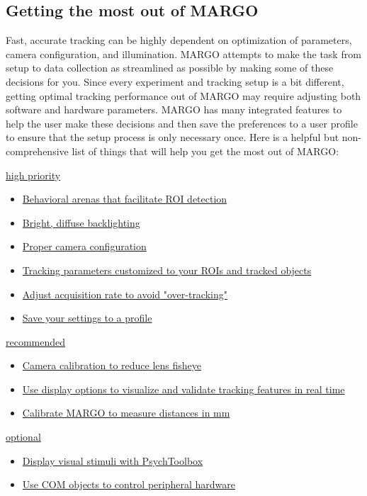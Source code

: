 \documentclass[11pt]{article}
\begin{document}
\subsection{Getting the most out of MARGO}

Fast, accurate tracking can be highly dependent on optimization of parameters, camera configuration, and illumination. MARGO attempts to make the task from setup to data collection as streamlined as possible by making some of these decisions for you. Since every experiment and tracking setup is a bit different, getting optimal tracking performance out of MARGO may require adjusting both software and hardware parameters. MARGO has many integrated features to help the user make these decisions and then save the preferences to a user profile to ensure that the setup process is only necessary once. Here is a helpful but non-comprehensive list of things that will help you get the most out of MARGO: 

\vspace*{0.15cm}
\small
\underline{high priority}
\vspace*{-0.45cm}
\begin{itemize}
	\itemsep0em 
	\item \hyperlink{arenasection}{Behavioral arenas that facilitate ROI detection} 
	\item \hyperlink{illumsection}{Bright, diffuse backlighting}
	\item \hyperlink{camconfig}{Proper camera configuration}
	\item \hyperlink{trackingparam}{Tracking parameters customized to your ROIs and tracked objects}
	\item \hyperlink{targetrate}{Adjust acquisition rate to avoid "over-tracking"}
	\item \hyperlink{saveprofile}{Save your settings to a profile}
\end{itemize}
\vspace*{-0.15cm}
\underline{recommended}
\vspace*{-0.45cm}
\begin{itemize}
	\itemsep0em 
	\item \hyperlink{camcalibrate}{Camera calibration to reduce lens fisheye} 
	\item \hyperlink{viewoptions}{Use display options to visualize and validate tracking features in real time}
	\item \hyperlink{distscale}{Calibrate MARGO to measure distances in mm}
\end{itemize}
\vspace*{-0.15cm}
\underline{optional}
\vspace*{-0.45cm}
\begin{itemize}
	\itemsep0em 
	\item \hyperlink{projsection}{Display visual stimuli with PsychToolbox} 
	\item \hyperlink{comsection}{Use COM objects to control peripheral hardware}
\end{itemize}
\end{document}
